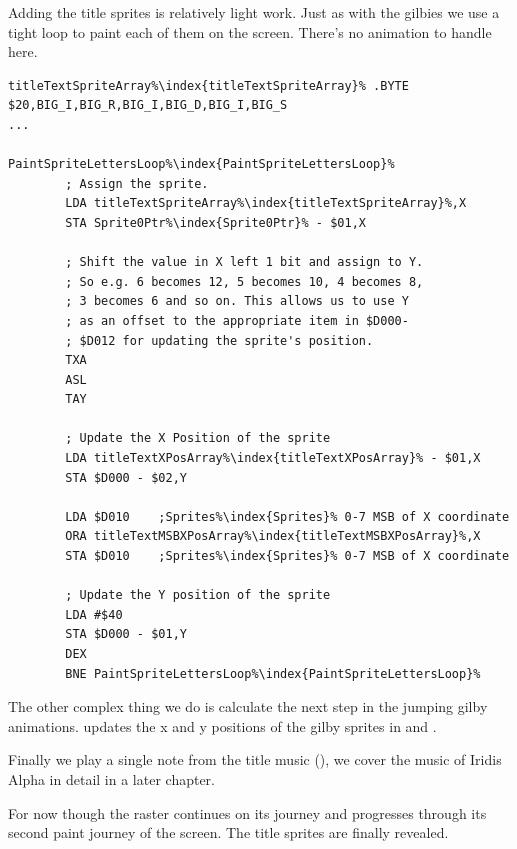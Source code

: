 Adding the title sprites is relatively light work. Just as with the gilbies we use a tight loop to paint each of them
on the screen. There's no animation to handle here.

\begin{lstlisting}[escapechar=\%]
titleTextSpriteArray%\index{titleTextSpriteArray}% .BYTE $20,BIG_I,BIG_R,BIG_I,BIG_D,BIG_I,BIG_S
...

PaintSpriteLettersLoop%\index{PaintSpriteLettersLoop}%   
        ; Assign the sprite.
        LDA titleTextSpriteArray%\index{titleTextSpriteArray}%,X
        STA Sprite0Ptr%\index{Sprite0Ptr}% - $01,X

        ; Shift the value in X left 1 bit and assign to Y.
        ; So e.g. 6 becomes 12, 5 becomes 10, 4 becomes 8,
        ; 3 becomes 6 and so on. This allows us to use Y
        ; as an offset to the appropriate item in $D000-
        ; $D012 for updating the sprite's position.
        TXA
        ASL
        TAY

        ; Update the X Position of the sprite
        LDA titleTextXPosArray%\index{titleTextXPosArray}% - $01,X
        STA $D000 - $02,Y

        LDA $D010    ;Sprites%\index{Sprites}% 0-7 MSB of X coordinate
        ORA titleTextMSBXPosArray%\index{titleTextMSBXPosArray}%,X
        STA $D010    ;Sprites%\index{Sprites}% 0-7 MSB of X coordinate

        ; Update the Y position of the sprite
        LDA #$40
        STA $D000 - $01,Y
        DEX
        BNE PaintSpriteLettersLoop%\index{PaintSpriteLettersLoop}%

\end{lstlisting}

The other complex thing we do is calculate the next step in the jumping gilby animations. 
updates the x and y positions of the gilby sprites in  and .

Finally we play a single note from the title music (), we cover the music of Iridis Alpha
in detail in a later chapter.

For now though the raster continues on its journey and progresses through its second paint journey of the screen. The title sprites
are finally revealed.

